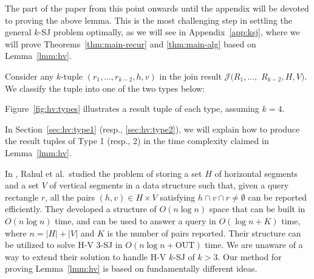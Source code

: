 \documentclass[sigconf]{acmart}
\def\vgap{\vspace{1mm}}
\def\extraspacing{\vspace{2mm} \noindent}
\def\J{\mathcal{J}}
\def\out{\mathrm{OUT}}
\begin{document}
The part of the paper from this point onwards until the appendix will be devoted to proving the above lemma. This is the most challenging step in settling the general $k$-SJ problem optimally, as we will see in Appendix~\ref{app:ksj}, where we will prove Theorems~\ref{thm:main-recur} and \ref{thm:main-alg} based on Lemma~\ref{lmm:hv}.

\vgap



Consider any $k$-tuple $(r_1, ..., r_{k-2}, h, v)$ in the join result $\J(R_1, ...,$ $R_{k-2}, H, V)$. We classify the tuple into one of the two types below:

Figure~\ref{fig:hv:types} illustrates a result tuple of each type, assuming $k = 4$.

\vgap 

In Section~\ref{sec:hv:type1} (resp., \ref{sec:hv:type2}), we will explain how to produce the result tuples of Type 1 (resp., 2) in the time complexity claimed in Lemma~\ref{lmm:hv}.

\extraspacing {\bf Remark.} In \cite{rdr+11}, Rahul et al.\ studied the problem of storing a set $H$ of horizontal segments and a set $V$ of vertical segments in a data structure such that, given a query rectangle $r$, all the pairs $(h, v) \in H \times V$ satisfying $h \cap v \cap r \ne \emptyset$ can be reported efficiently. They developed a structure of $O(n \log n)$ space that can be built in $O(n \log n)$ time, and can be used to answer a query in $O(\log n + K)$ time, where $n = |H| + |V|$ and $K$ is the number of pairs reported. Their structure can be utilized to solve H-V 3-SJ in $O(n \log n + \out)$ time. We are unaware of a way to extend their solution to handle H-V $k$-SJ of $k > 3$. Our method for proving Lemma~\ref{lmm:hv} is based on fundamentally different ideas. 

\end{document}
